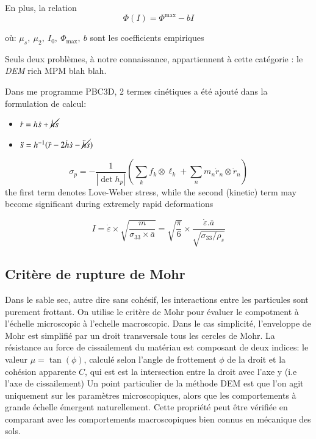 \documentclass[5p,authoryear,square]{elsarticle}
\begin{document}
En plus, la relation 
\begin{equation}
\Phi(I) = \Phi^{\max} - bI
\label{phiI}
\end{equation}

où: $\mu_s,\ \mu_2,\ I_0,\ \Phi_{\text{max}},\ b $ sont les coefficients empiriques

Seuls deux problèmes, à notre connaissance, appartiennent à cette catégorie : le \emph{DEM} rich MPM blah blah.

Dans me programme PBC3D, 2 termes cinétiques a été ajouté  dans la formulation de calcul:
\begin{itemize}
	\item $\dot{r} = h\dot{s} + \cancel{\dot{h}s}$
	\item $\ddot{s} = h^{-1}(\ddot{r} - 2\dot{h}\dot{s} - \cancel{\ddot{h}s})$
\end{itemize}

\begin{equation}
    \sigma_p = -\frac{1}{|\det h_p|} \left( \sum_k f_k \otimes \ell_k + \sum_n m_n \dot{r}_n \otimes \dot{r}_n \right)
    \label{eq:contrainteDynamique}
\end{equation}	
the first term denotes Love-Weber stress, while the
second (kinetic) term may become significant during extremely rapid deformations

\begin{equation}
    I = \dot{\varepsilon} \times \sqrt{\frac{m}{\sigma_{33} \times \bar{a}}}
 = \sqrt{\frac{\pi}{6}} \times \frac{\dot{\varepsilon} .\bar{a}}{\sqrt{\sigma_{33}/\rho_s}}
    \label{eq:placeholder_label}
\end{equation}



\subsection{Critère de rupture de Mohr} \label{Mohr}
Dans le sable sec, autre dire sans cohésif, les interactions entre les particules sont purement frottant. 
On utilise le critère de Mohr pour évaluer le compotment à l'échelle microscopic à l'echelle macroscopic.
Dans le cas simplicité, l'enveloppe de Mohr est simplifié par un droit transversale tous les cercles de Mohr.
La résistance au force de cissailement du matériau est composant de deux indices: le valeur $\mu = \tan(\phi)$, calculé selon l'angle de frottement $\phi$ de la droit et la cohésion apparente $C$, qui est est la intersection entre la droit avec l'axe y (i.e l'axe de cissailement)
Un point particulier de la méthode DEM est que l’on agit uniquement sur les paramètres microscopiques, alors que les comportements à grande échelle émergent naturellement.  
Cette propriété peut être vérifiée en comparant avec les comportements macroscopiques bien connus en mécanique des sols.  
\end{document}
